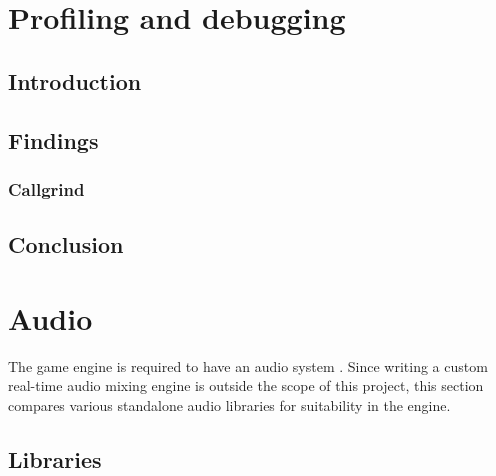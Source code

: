 \documentclass{projdoc}
\begin{document}
\section{Profiling and debugging}



\subsection{Introduction}

\subsection{Findings}

\subsubsection{Callgrind}

\begin{comparison}
\end{comparison}

\subsection{Conclusion}

\section{Audio}

The game engine is required to have an audio system
\autocite[\ref{req:audio}]{crepe:requirements}. Since writing a custom real-time
audio mixing engine is outside the scope of this project\mref, this section compares
various standalone audio libraries for suitability in the engine.

\subsection{Libraries}
\label{sec:audio:libs}
\end{document}
